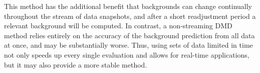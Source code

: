 This method has the additional benefit that backgrounds can change continually throughout the stream of data snapshots, and after a short readjustment period a relevant background will be computed. In contrast, a non-streaming DMD method relies entirely on the accuracy of the background prediction from all data at once, and may be substantially worse. Thus, using sets of data limited in time not only speeds up every single evaluation and allows for real-time applications, but it may also provide a more stable method.
